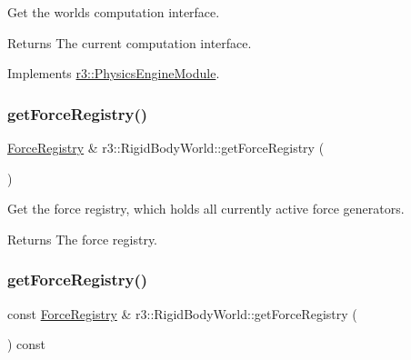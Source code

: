 Get the world\textquotesingle{}s computation interface. 

\begin{DoxyReturn}{Returns}
The current computation interface. 
\end{DoxyReturn}


Implements \mbox{\hyperlink{classr3_1_1_physics_engine_module_a3b1d0d9bea0a82534f367f6d728312d3}{r3\+::\+Physics\+Engine\+Module}}.

\mbox{\label{classr3_1_1_rigid_body_world_acfdc56e2796e5e0d86dbf71582e1b8c2}} 
\subsubsection{\texorpdfstring{get\+Force\+Registry()}{getForceRegistry()}\hspace{0.1cm}{\footnotesize\ttfamily [1/2]}}
{\footnotesize\ttfamily \mbox{\hyperlink{classr3_1_1_force_registry}{Force\+Registry}} \& r3\+::\+Rigid\+Body\+World\+::get\+Force\+Registry (\begin{DoxyParamCaption}{ }\end{DoxyParamCaption})}



Get the force registry, which holds all currently active force generators. 

\begin{DoxyReturn}{Returns}
The force registry. 
\end{DoxyReturn}
\mbox{\label{classr3_1_1_rigid_body_world_a5ec345de8bdc6e910797434de918dbc2}} 
\subsubsection{\texorpdfstring{get\+Force\+Registry()}{getForceRegistry()}\hspace{0.1cm}{\footnotesize\ttfamily [2/2]}}
{\footnotesize\ttfamily const \mbox{\hyperlink{classr3_1_1_force_registry}{Force\+Registry}} \& r3\+::\+Rigid\+Body\+World\+::get\+Force\+Registry (\begin{DoxyParamCaption}{ }\end{DoxyParamCaption}) const}



